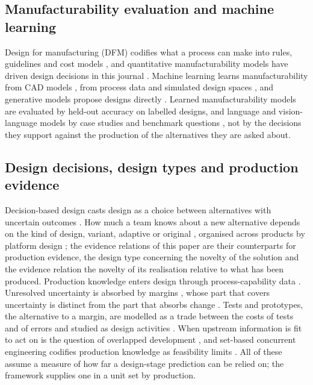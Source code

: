\documentclass[pdflatex,sn-basic,lineno]{sn-jnl}
\begin{document}
\subsection{Manufacturability evaluation and machine learning}

Design for manufacturing (DFM) codifies what a process can make into rules, guidelines and cost models \citep{boothroyd2010product}, and quantitative manufacturability models have driven design decisions in this journal \citep{latrobe2003design}. Machine learning learns manufacturability from CAD models \citep{ghadai2018learning, zhang2018featurenet}, from process data and simulated design spaces \citep{yan2026machine}, and generative models propose designs directly \citep{regenwetter2022deep}. Learned manufacturability models are evaluated by held-out accuracy on labelled designs, and language and vision-language models by case studies \citep{makatura2024how} and benchmark questions \citep{picard2025concept}, not by the decisions they support against the production of the alternatives they are asked about.

\subsection{Design decisions, design types and production evidence}

Decision-based design casts design as a choice between alternatives with uncertain outcomes \citep{hazelrigg1998framework}. How much a team knows about a new alternative depends on the kind of design, variant, adaptive or original \citep{pahl2007engineering}, organised across products by platform design \citep{simpson2006product}; the evidence relations of this paper are their counterparts for production evidence, the design type concerning the novelty of the solution and the evidence relation the novelty of its realisation relative to what has been produced. Production knowledge enters design through process-capability data \citep{thornton2004variation, tata1999process}. Unresolved uncertainty is absorbed by margins \citep{eckert2019design}, whose part that covers uncertainty is distinct from the part that absorbs change \citep{eckert2017safety}. Tests and prototypes, the alternative to a margin, are modelled as a trade between the costs of tests and of errors \citep{thomke1998simulation, thomke2001sequential, salado2018mathematical} and studied as design activities \citep{tahera2019testing}. When upstream information is fit to act on is the question of overlapped development \citep{krishnan1997model, terwiesch2002exchanging}, and set-based concurrent engineering codifies production knowledge as feasibility limits \citep{sobek1999toyota}. All of these assume a measure of how far a design-stage prediction can be relied on; the framework supplies one in a unit set by production.
\end{document}
